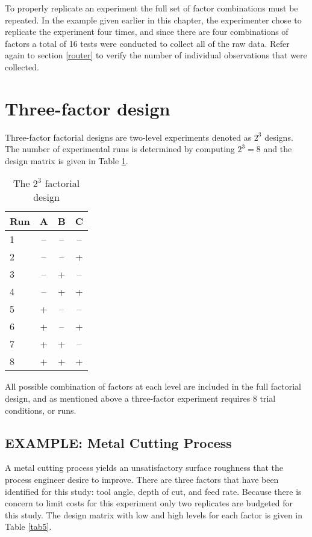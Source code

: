 To properly replicate an experiment the full set of factor combinations must be repeated.  In the example given earlier in this chapter, the experimenter chose to replicate the experiment four times, and since there are four combinations of factors a total of 16 tests were conducted to collect all of the raw data.  Refer again to section \ref{router} to verify the number of individual observations that were collected.

\section{Three-factor design}
Three-factor factorial designs are two-level experiments denoted as $ 2^{3} $ designs. The number of experimental runs is determined by computing $ 2^{3} = 8 $ and the design matrix is given in Table \ref{tab4}.
\begin{table}[h]\caption{The $2^{3}$ factorial design}\label{tab4}
\begin{center}
\begin{tabular}{|l|c|c|c|}
\hline Run & A & B & C\\ 
\hline 1 & -- & -- & --\\ 
\hline 2 & -- & -- & \cellcolor{black!95}+\\ 
\hline 3 & -- & \cellcolor{black!95}+ & --\\ 
\hline 4 & -- & \cellcolor{black!95}+ & \cellcolor{black!95}+\\
\hline 5 & \cellcolor{black!95}+ & -- & --\\
\hline 6 & \cellcolor{black!95}+ & -- & \cellcolor{black!95}+\\
\hline 7 & \cellcolor{black!95}+ & \cellcolor{black!95}+ & --\\
\hline 8 & \cellcolor{black!95}+ & \cellcolor{black!95}+ & \cellcolor{black!95}+\\ 
\hline 
\end{tabular} 
\end{center}
\end{table}
All possible combination of factors at each level are included in the full factorial design, and as mentioned above  a three-factor experiment requires 8 trial conditions, or runs.  

\subsection{EXAMPLE: Metal Cutting Process}
A metal cutting process yields an unsatisfactory surface roughness that the process engineer desire to improve.  There are three factors that have been identified for this study: tool angle, depth of cut, and feed rate. Because there is concern to limit costs for this experiment only two replicates are budgeted for this study.  The design matrix with low and high levels for each factor is given in Table \ref{tab5}.


